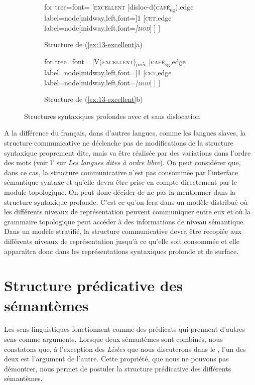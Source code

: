 {\begin{figure}[H]
	\begin{subfigure}[b]{0.5\textwidth}
		\centering
		\begin{forest} for tree={font=\normalfont}
			[\textsc{excellent}
				[disloc-d(\textsc{café}\textsubscript{sg}),edge label={node[midway,left,font=\footnotesize]{1}}
					[\textsc{cet},edge label={node[midway,left,font=\footnotesize\itshape]{\textsc{mod}}}]
				]
			]
		\end{forest}
		\caption{Structure de (\ref{ex:13-excellent}a)}
	\end{subfigure}%
	\hfill
	\begin{subfigure}[b]{0.5\textwidth}
		\centering
		\begin{forest} for tree={font=\normalfont}
			[V(\textsc{excellent})\textsubscript{prés}
				[\textsc{café}\textsubscript{sg},edge label={node[midway,left,font=\footnotesize]{1}}
					[\textsc{cet},edge label={node[midway,left,font=\footnotesize\itshape]{\textsc{mod}}}]
				]
			]
		\end{forest}
		\caption{Structure de (\ref{ex:13-excellent}b)}
	\end{subfigure}
\caption{Structures syntaxiques profondes avec et sans dislocation\label{fig:13-excellent}}
\end{figure}

A la différence du français, dans d’autres langues, comme les langues slaves, la structure communicative ne déclenche pas de modifications de la structure syntaxique proprement dite, mais va être réalisée par des variations dans l’ordre des mots (voir l’ sur \textit{Les langues dites à ordre libre}). On peut considérer que, dans ce cas, la structure communicative n’est pas consommée par l’interface sémantique-syntaxe et qu’elle devra être prise en compte directement par le module topologique. On peut donc décider de ne pas la mentionner dans la structure syntaxique profonde. C’est ce qu’on fera dans un modèle distribué où les différents niveaux de représentation peuvent communiquer entre eux et où la grammaire topologique peut accéder à des informations de niveau sémantique. Dans un modèle stratifié, la structure communicative devra être recopiée aux différents niveaux de représentation jusqu’à ce qu’elle soit consommée et elle apparaîtra donc dans les représentations syntaxiques profonde et de surface.}

\section{Structure prédicative des sémantèmes}\label{sec:13-argument}
Les sens linguistiques fonctionnent comme des prédicats qui prennent d’autres sens comme arguments. Lorsque deux sémantèmes sont combinés, nous constatons que, à l'exception des \textit{Listes} que nous discuterons dans le , l’un des deux est l’argument de l’autre. Cette propriété, que nous ne pouvons pas démontrer, nous permet de postuler la structure prédicative des différents sémantèmes. 

